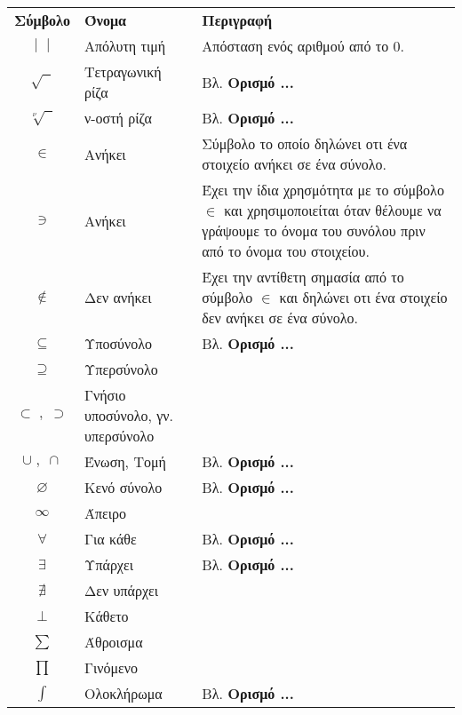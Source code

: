 \documentclass[twoside,10pt]{book}
\begin{document}
\newpage
\noindent
{\par\centering
\begin{tabularx}{\textwidth}{c>{\centering}m{3.1cm}>{\centering\arraybackslash}m{7.75cm}}
\hline\rule[-2ex]{0pt}{5.5ex}\textbf{Σύμβολο} & \textbf{Όνομα} & \textbf{Περιγραφή}\\
\hhline{===}\rule[-2ex]{0pt}{8.5ex}
$ |\;\;| $ & Απόλυτη τιμή & Απόσταση ενός αριθμού από το 0. \\
\rule[-2ex]{0pt}{5.5ex}
$ \sqrt{\;\;} $ & Τετραγωνική ρίζα & Βλ. \textbf{Ορισμό ...} \\
\rule[-2ex]{0pt}{5.5ex}
$ \sqrt[\nu]{\;\;} $ & ν-οστή ρίζα & Βλ. \textbf{Ορισμό ...} \\
\rule[-2ex]{0pt}{7.5ex}
$ \in $ & Ανήκει & Σύμβολο το οποίο δηλώνει οτι ένα στοιχείο ανήκει σε ένα σύνολο. \\
\rule[-2ex]{0pt}{7.5ex}
$ \ni $ & Ανήκει & Έχει την ίδια χρησμότητα με το σύμβολο $ \in $ και χρησιμοποιείται όταν θέλουμε να γράψουμε το όνομα του συνόλου πριν από το όνομα του στοιχείου. \\
\rule[-2ex]{0pt}{7.5ex}
$ \notin $ & Δεν ανήκει & Έχει την αντίθετη σημασία από το σύμβολο $ \in $ και δηλώνει οτι ένα στοιχείο δεν ανήκει σε ένα σύνολο. \\
\rule[-2ex]{0pt}{5.5ex}
$ \subseteq $ & Υποσύνολο & Βλ. \textbf{Ορισμό ...} \\
\rule[-2ex]{0pt}{5.5ex}
$ \supseteq $ & Υπερσύνολο & \\
\rule[-2ex]{0pt}{5.5ex}
$ \subset\;,\;\supset $ & Γνήσιο υποσύνολο, γν. υπερσύνολο & \\
\rule[-2ex]{0pt}{5.5ex}
$ \cup\;,\;\cap $ & Ένωση, Τομή & Βλ. \textbf{Ορισμό ...} \\
\rule[-2ex]{0pt}{5.5ex}
$ \varnothing $ & Κενό σύνολο & Βλ. \textbf{Ορισμό ...} \\
\rule[-2ex]{0pt}{5.5ex}
$ \infty $ & Άπειρο & \\
\rule[-2ex]{0pt}{5.5ex}
$ \forall $ & Για κάθε & Βλ. \textbf{Ορισμό ...} \\
\rule[-2ex]{0pt}{5.5ex}
$ \exists $ & Υπάρχει & Βλ. \textbf{Ορισμό ...} \\
\rule[-2ex]{0pt}{5.5ex}
$ \nexists $ & Δεν υπάρχει & \\	
\rule[-2ex]{0pt}{5.5ex}
$ \bot $ & Κάθετο & \\
\rule[-2ex]{0pt}{5.5ex}
$ \sum $ & Άθροισμα & \\
\rule[-2ex]{0pt}{5.5ex}
$ \prod $ & Γινόμενο & \\
\rule[-2ex]{0pt}{5.5ex}
$ \displaystyle\int $ & Ολοκλήρωμα & Βλ. \textbf{Ορισμό ...} \\
\hline
\end{tabularx}
\par}
\end{document}
